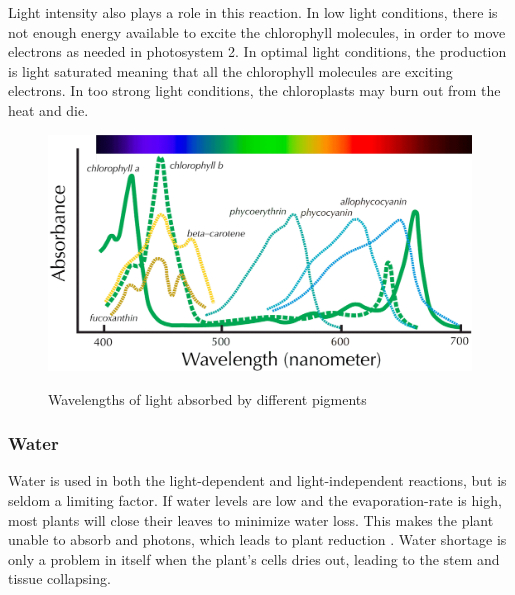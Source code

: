 Light intensity also plays a role in this reaction. In low light conditions, there is not enough energy available to excite the chlorophyll molecules, in order to move electrons as needed in photosystem 2. In optimal light conditions, the production is light saturated meaning that all the chlorophyll molecules are exciting electrons. In too strong light conditions, the chloroplasts may burn out from the heat and die.  

\begin{figure}
        \centering
        \includegraphics[width=1\textwidth]{img/photosynthesis/Pigment_spectra.png}
        \caption{Wavelengths of light absorbed by different pigments}
        \citep{uicbiology}
        \label{fig:wavelengthabsorbtion}
\end{figure}

\subsubsection{Water}
Water is used in both the light-dependent and light-independent reactions, but is seldom a limiting factor. If water levels are low and the evaporation-rate is high, most plants will close their leaves to minimize water loss. This makes the plant unable to absorb  and photons, which leads to plant reduction \citep{bi2}. Water shortage is only a problem in itself when the plant's cells dries out, leading to the stem and tissue collapsing. 



